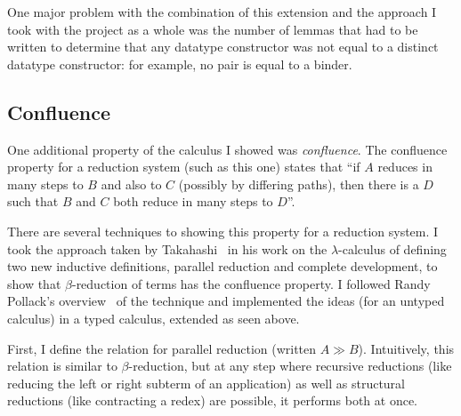 One major problem with the combination of this extension and the approach I took with the project as a whole was the number of lemmas that had to be written to determine that any datatype constructor was not equal to a distinct datatype constructor: for example, no pair is equal to a binder.

\subsection{Confluence}
\label{sec:confluence}
One additional property of the calculus I showed was \emph{confluence}.
The confluence property for a reduction system (such as this one) states that ``if \(A\) reduces in many steps to \(B\) and also to \(C\) (possibly by differing paths), then there is a \(D\) such that \(B\) and \(C\) both reduce in many steps to \(D\)''.

There are several techniques to showing this property for a reduction system.
I took the approach taken by Takahashi~\cite{Takahashi} in his work on the \(\lambda\)-calculus of defining two new inductive definitions, parallel reduction and complete development, to show that \(\beta\)-reduction of terms has the confluence property.
I followed Randy Pollack's overview~\cite{pollack} of the technique and implemented the ideas (for an untyped calculus) in a typed calculus, extended as seen above.

First, I define the relation for parallel reduction (written \(A \gg B\)).
Intuitively, this relation is similar to \(\beta\)-reduction, but at any step where recursive reductions (like reducing the left or right subterm of an application) as well as structural reductions (like contracting a redex) are possible, it performs both at once.

